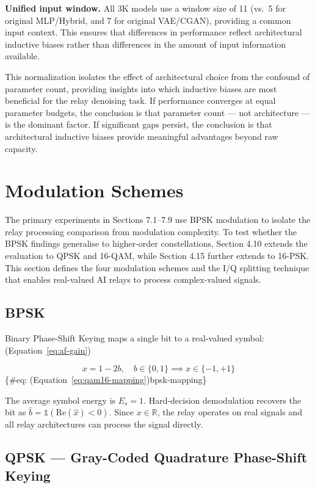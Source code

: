 \textbf{Unified input window.} All 3K models use a window size of 11 (vs.~5 for original MLP/Hybrid, and 7 for original VAE/CGAN), providing a common input context. This ensures that differences in performance reflect architectural inductive biases rather than differences in the amount of input information available.

This normalization isolates the effect of architectural choice from the confound of parameter count, providing insights into which inductive biases are most beneficial for the relay denoising task. If performance converges at equal parameter budgets, the conclusion is that parameter count --- not architecture --- is the dominant factor. If significant gaps persist, the conclusion is that architectural inductive biases provide meaningful advantages beyond raw capacity.

\section{Modulation Schemes}\label{sec:modulation-schemes}

The primary experiments in Sections 7.1--7.9 use BPSK modulation to isolate the relay processing comparison from modulation complexity. To test whether the BPSK findings generalise to higher-order constellations, Section 4.10 extends the evaluation to QPSK and 16-QAM, while Section 4.15 further extends to 16-PSK. This section defines the four modulation schemes and the I/Q splitting technique that enables real-valued AI relays to process complex-valued signals.

\subsection{BPSK}\label{sec:bpsk}

Binary Phase-Shift Keying maps a single bit to a real-valued symbol: (Equation~\ref{eq:af-gain})

\[x = 1 - 2b, \quad b \in \{0, 1\} \implies x \in \{-1, +1\}
\] \{\#eq: (Equation~\ref{eq:qam16-mapping})bpsk-mapping\}

The average symbol energy is \(E_s = 1\). Hard-decision demodulation recovers the bit as \(\hat{b} = \mathbb{1}(\text{Re}(\hat{x}) < 0)\). Since \(x \in \mathbb{R}\), the relay operates on real signals and all relay architectures can process the signal directly.

\subsection{QPSK --- Gray-Coded Quadrature Phase-Shift Keying}\label{sec:qpsk-gray-coded-quadrature-phase-shift-keying}

